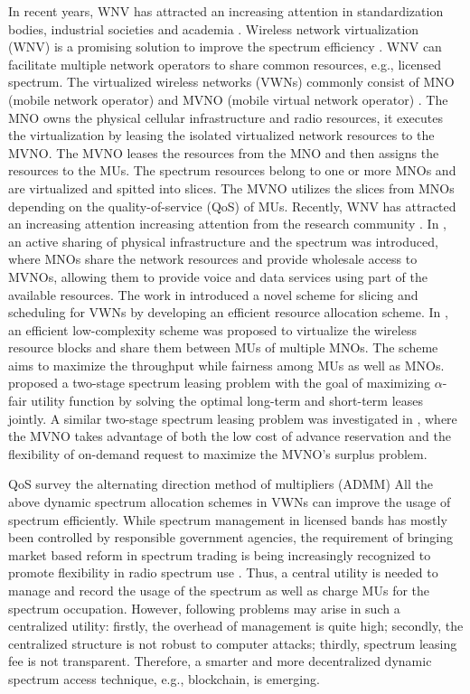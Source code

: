 \documentclass[journal]{IEEEtran}
\begin{document}
\begin{IEEEkeywords}
In recent years, WNV has attracted an increasing attention in standardization bodies, industrial societies and academia \cite{LZhao,3GPP,XCostaPerez,MIKamel,MKalil,YXZhang1,YXZhang2}.
Wireless network virtualization (WNV) is a promising solution to improve the spectrum efficiency \cite{CLiang,LZhao,3GPP}. WNV can facilitate multiple network operators to share common resources, e.g., licensed spectrum. The virtualized wireless networks (VWNs) commonly consist of MNO (mobile network operator) and MVNO (mobile virtual network operator) \cite{RKokku}. The MNO owns the physical cellular infrastructure and radio resources, it executes the virtualization by leasing the isolated virtualized network resources to the MVNO. The MVNO leases the resources from the MNO and then assigns the resources to the MUs. The spectrum resources belong to one or more MNOs and are virtualized and spitted into slices. The MVNO utilizes the slices from MNOs depending on the quality-of-service (QoS) of MUs. Recently, WNV has attracted an increasing attention increasing attention from the research community \cite{XCostaPerez,MIKamel,MKalil,YXZhang1,YXZhang2}. In \cite{XCostaPerez}, an active sharing of physical infrastructure and the spectrum was introduced, where MNOs share the network resources and provide wholesale access to MVNOs, allowing them to provide voice and data services using part of the available resources. The work in \cite{MIKamel} introduced a novel scheme for slicing and scheduling for VWNs by developing an efficient resource allocation scheme. In \cite{MKalil}, an efficient low-complexity
scheme was proposed to virtualize the wireless resource blocks and
share them between MUs of multiple MNOs. The scheme aims to maximize the throughput
while fairness among MUs as well as MNOs. \cite{YXZhang1} proposed a two-stage spectrum leasing problem with the goal of maximizing $\alpha$-fair utility function by solving the optimal long-term and short-term leases jointly. A similar two-stage spectrum leasing problem was investigated in \cite{YXZhang2}, where the MVNO takes advantage of both the low cost of advance reservation and the flexibility of on-demand request to maximize the MVNO’s surplus problem.

QoS  survey the alternating direction method of multipliers (ADMM)
All the above dynamic spectrum allocation schemes in VWNs can improve the usage of spectrum efficiently. While spectrum management in licensed bands has
mostly been controlled by responsible government agencies, the requirement of bringing market based reform in spectrum trading is being increasingly recognized to promote flexibility in radio spectrum use \cite{FBltr}. Thus, a central utility is needed to manage and record the usage of the spectrum as well as charge MUs for the spectrum occupation. However, following problems may arise in such a centralized utility: firstly, the overhead of management is quite high; secondly, the centralized structure is not robust to computer attacks; thirdly, spectrum leasing fee is not transparent. Therefore, a smarter and more decentralized dynamic spectrum access technique, e.g., blockchain, is emerging.


\end{IEEEkeywords}
\end{document}
